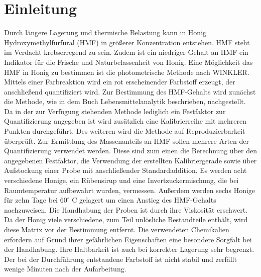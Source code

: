 \chapter{Einleitung} 

Durch längere Lagerung und thermische Belastung kann in Honig Hydroxymethylfurfural (HMF) in größerer Konzentration entstehen. HMF steht im Verdacht krebserregend zu sein. Zudem ist ein niedriger Gehalt an HMF ein Indikator für die Frische und Naturbelassenheit von Honig.
\newline
Eine Möglichkeit das HMF in Honig zu bestimmen ist die photometrische Methode nach WINKLER. Mittels einer Farbreaktion wird ein rot erscheinender Farbstoff erzeugt, der anschließend quantifiziert wird. Zur  Bestimmung des HMF-Gehalts wird zunächst die Methode, wie in dem Buch Lebensmittelanalytik beschrieben, nachgestellt. Da in der zur Verfügung stehenden Methode lediglich ein Festfaktor zur Quantifizierung angegeben ist wird zusätzlich eine Kalibrierreihe mit mehreren Punkten durchgeführt. Des weiteren wird die Methode auf Reproduzierbarkeit überprüft. Zur Ermittlung des Massenanteils an HMF sollen mehrere Arten der Quantifizierung verwendet werden. Diese sind zum einen die Berechnung über den angegebenen Festfaktor, die Verwendung der erstellten Kalibriergerade sowie über Aufstockung einer Probe mit anschließender Standardaddition. Es werden acht verschiedene Honige, ein Rübensirup und eine Invertzuckermischung, die bei Raumtemperatur aufbewahrt wurden, vermessen. Außerdem werden sechs Honige für zehn Tage bei $60^\circ$ C gelagert um einen Anstieg des HMF-Gehalts nachzuweisen. Die Handhabung der Proben ist durch ihre Viskosität erschwert. Da der Honig viele verschiedene, zum Teil unlösliche Bestandteile enthält, wird diese Matrix vor der Bestimmung entfernt. Die verwendeten Chemikalien erfordern auf Grund ihrer gefährlichen Eigenschaften eine besondere Sorgfalt bei der Handhabung. Ihre Haltbarkeit ist auch bei korrekter Lagerung sehr begrenzt. Der bei der Durchführung entstandene Farbstoff ist nicht stabil und zerfällt wenige Minuten nach der Aufarbeitung. %